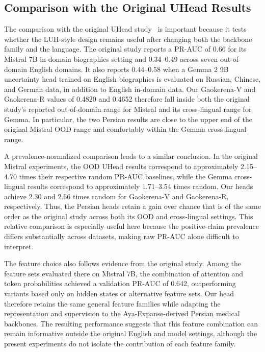 \documentclass[conference]{IEEEtran}
\begin{document}
\subsection{Comparison with the Original UHead Results}

The comparison with the original UHead study~\cite{b1} is important because it tests whether the LUH-style design remains useful after changing both the backbone family and the language. The original study reports a PR-AUC of 0.66 for its Mistral 7B in-domain biographies setting and 0.34--0.49 across seven out-of-domain English domains. It also reports 0.44--0.58 when a Gemma 2 9B uncertainty head trained on English biographies is evaluated on Russian, Chinese, and German data, in addition to English in-domain data. Our Gaokerena-V and Gaokerena-R values of 0.4820 and 0.4652 therefore fall inside both the original study's reported out-of-domain range for Mistral and its cross-lingual range for Gemma. In particular, the two Persian results are close to the upper end of the original Mistral OOD range and comfortably within the Gemma cross-lingual range.

A prevalence-normalized comparison leads to a similar conclusion. In the original Mistral experiments, the OOD UHead results correspond to approximately 2.15--4.70 times their respective random PR-AUC baselines, while the Gemma cross-lingual results correspond to approximately 1.71--3.54 times random. Our heads achieve 2.30 and 2.66 times random for Gaokerena-V and Gaokerena-R, respectively. Thus, the Persian heads retain a gain over chance that is of the same order as the original study across both its OOD and cross-lingual settings. This relative comparison is especially useful here because the positive-claim prevalence differs substantially across datasets, making raw PR-AUC alone difficult to interpret.

The feature choice also follows evidence from the original study. Among the feature sets evaluated there on Mistral 7B, the combination of attention and token probabilities achieved a validation PR-AUC of 0.642, outperforming variants based only on hidden states or alternative feature sets. Our head therefore retains the same general feature families while adapting the representation and supervision to the Aya-Expanse-derived Persian medical backbones. The resulting performance suggests that this feature combination can remain informative outside the original English and model settings, although the present experiments do not isolate the contribution of each feature family.
\end{document}
